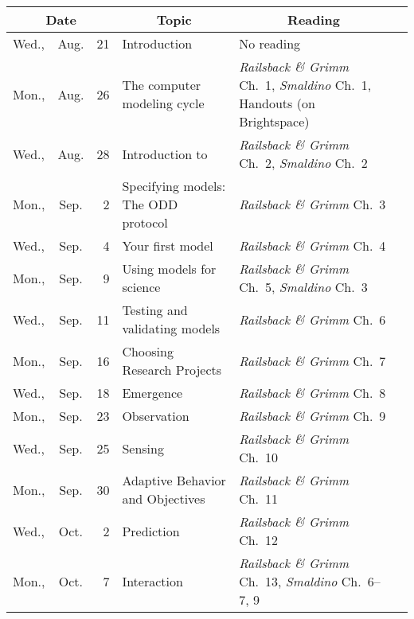\documentclass[11pt,twoside]{jgsyllabus}\usepackage[]{graphicx}\usepackage[]{xcolor}
\begin{document}
\setlength{\aboverulesep}{0.2ex}
\setlength{\belowrulesep}{0.2ex}
\setlength{\extrarowheight}{0.1ex}
\setlength{\heavyrulewidth}{0.5pt}
\setlength{\lightrulewidth}{0.05pt}
\begin{center}
\begin{tabular}{l@{~}c@{~}r>{\raggedright}m{2.6in}>{\centering}m{2in}c}
  \toprule
  \multicolumn{3}{c}{\bfseries Date} & \multicolumn{1}{c}{\bfseries Topic} &\multicolumn{1}{c}{\bfseries Reading} &\\
 \midrule
Wed., & Aug. &  21 & Introduction & No reading &  \\ 
   \midrule
Mon., & Aug. &  26 & The computer modeling cycle & \emph{Railsback \& Grimm\/} Ch.~1, \emph{Smaldino\/} Ch.~1, Handouts (on Brightspace) &  \\ 
   \midrule
Wed., & Aug. &  28 & Introduction to \NetLogo{} & \emph{Railsback \& Grimm\/} Ch.~2, \emph{Smaldino\/} Ch.~2 &  \\ 
   \midrule
Mon., & Sep. &   2 & Specifying models: The ODD protocol & \emph{Railsback \& Grimm\/} Ch.~3 &  \\ 
   \midrule
Wed., & Sep. &   4 & Your first model & \emph{Railsback \& Grimm\/} Ch.~4 &  \\ 
   \midrule
Mon., & Sep. &   9 & Using models for science & \emph{Railsback \& Grimm\/} Ch.~5, \emph{Smaldino\/} Ch.~3 &  \\ 
   \midrule
Wed., & Sep. &  11 & Testing and validating models & \emph{Railsback \& Grimm\/} Ch.~6 &  \\ 
   \midrule
Mon., & Sep. &  16 & Choosing Research Projects & \emph{Railsback \& Grimm\/} Ch.~7 &  \\ 
   \midrule
Wed., & Sep. &  18 & Emergence & \emph{Railsback \& Grimm\/} Ch.~8 &  \\ 
   \midrule
Mon., & Sep. &  23 & Observation & \emph{Railsback \& Grimm\/} Ch.~9 &  \\ 
   \midrule
Wed., & Sep. &  25 & Sensing & \emph{Railsback \& Grimm\/} Ch.~10 &  \\ 
   \midrule
Mon., & Sep. &  30 & Adaptive Behavior and Objectives & \emph{Railsback \& Grimm\/} Ch.~11 &  \\ 
   \midrule
Wed., & Oct. &   2 & Prediction & \emph{Railsback \& Grimm\/} Ch.~12 &  \\ 
   \midrule
Mon., & Oct. &   7 & Interaction & \emph{Railsback \& Grimm\/} Ch.~13, \emph{Smaldino\/} Ch.~6--7, 9 &  \\ 

\end{tabular}
\end{center}
\end{document}
